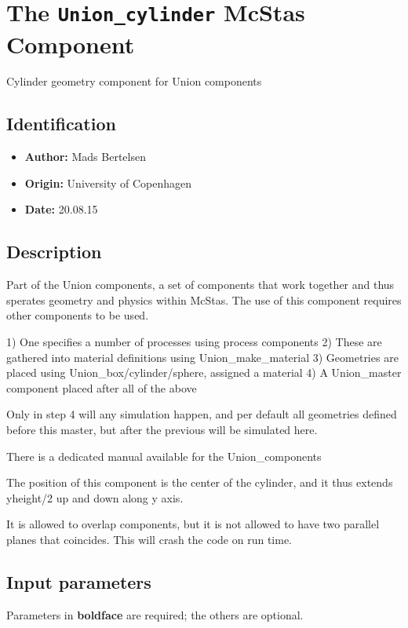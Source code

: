 \section{The \texttt{Union\_cylinder} McStas Component}
Cylinder geometry component for Union components

\subsection*{Identification}
\begin{itemize}
  \item \textbf{Author:} Mads Bertelsen
  \item \textbf{Origin:} University of Copenhagen
  \item \textbf{Date:} 20.08.15
\end{itemize}

\subsection*{Description}
Part of the Union components, a set of components that work together and thus sperates geometry and physics within McStas. The use of this component requires other components to be used.

1) One specifies a number of processes using process components 2) These are gathered into material definitions using Union\_make\_material 3) Geometries are placed using Union\_box/cylinder/sphere, assigned a material 4) A Union\_master component placed after all of the above

Only in step 4 will any simulation happen, and per default all geometries defined before this master, but after the previous will be simulated here.

There is a dedicated manual available for the Union\_components

The position of this component is the center of the cylinder, and it thus extends yheight/2 up and down along y axis.

It is allowed to overlap components, but it is not allowed to have two parallel planes that coincides. This will crash the code on run time.

\subsection*{Input parameters}
Parameters in \textbf{boldface} are required; the others are optional.


